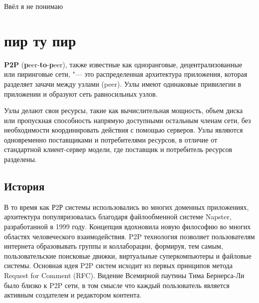 \documentclass[bachelor, och, coursework]{SCWorks}
\begin{document}




\tableofcontents

\intro
Ввёл я не понимаю

\section{пир ту пир}
\textbf{P2P} (\textbf{p}eer-\textbf{to}-\textbf{p}eer), также известные как одноранговые, децентрализованные или пиринговые сети, "--- это распределенная архитектура приложения, которая разделяет зачачи между узлами (peer). Узлы имеют одинаковые привилегии в приложении и образуют сеть равносильных узлов.

Узлы делают свои ресурсы, такие как вычислительная мощность, объем диска или пропускная способность напрямую доступными остальным членам сети, без необходимости координировать действия с помощью серверов. Узлы являются одновременно поставщиками и потребителями ресурсов, в отличие от стандартной клиент-сервер модели, где поставщик и потребитель ресурсов разделены.

\subsection{История}
В то время как Р2Р системы использовались во многих доменных приложениях, архитектура популяризовалась благодаря файлообменной системе Napster, разработанной в 1999 году. Концепция вдохновила новую философию во многих областях человеческого взаимодействия. P2P технология позволяет пользователям интернета образовывать группы и коллаборации, формируя, тем самым, пользовательские поисковые движки, виртуальные суперкомпьютеры и файловые системы. Основная идея P2P систем исходит из первых принципов метода Request for Comment (RFC). Видение Всемирной паутины Тима Бернерса-Ли было близко к P2P сети, в том смысле что каждый пользователь является активным создателем и редактором контента.
\end{document}
